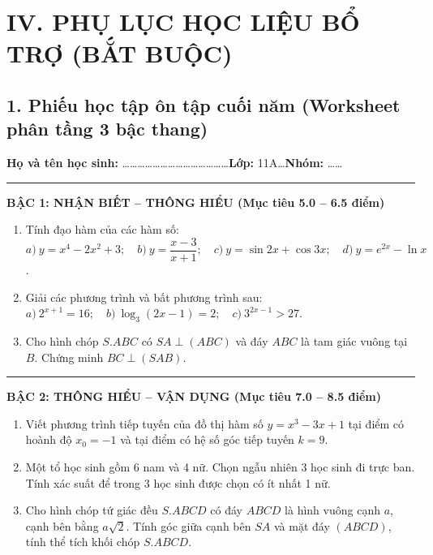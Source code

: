 \documentclass[12pt, a4paper]{article}
\begin{document}
\vspace{10pt}

\section*{IV. PHỤ LỤC HỌC LIỆU BỔ TRỢ (BẮT BUỘC)}

\subsection*{1. Phiếu học tập ôn tập cuối năm (Worksheet phân tầng 3 bậc thang)}

\begin{tcolorbox}[enhanced, colback=white, colframe=blue!70!black, arc=1.5mm, title=\textbf{PHIẾU HỌC TẬP TỔNG HỢP: ÔN TẬP CUỐI NĂM TOÁN 11}]
\textbf{Họ và tên học sinh:} \dots\dots\dots\dots\dots\dots\dots\dots\dots\dots\dots\dots\dots\dots \textbf{Lớp:} 11A\dots \quad \textbf{Nhóm:} \dots\dots

\vspace{3pt}
\hrule
\vspace{5pt}

\textbf{\large BẬC 1: NHẬN BIẾT -- THÔNG HIỂU (Mục tiêu 5.0 -- 6.5 điểm)}
\begin{enumerate}[label=\textbf{Bài 1.\arabic*.}]
    \item Tính đạo hàm của các hàm số:
    $a) \ y = x^4 - 2x^2 + 3; \quad b) \ y = \dfrac{x - 3}{x + 1}; \quad c) \ y = \sin 2x + \cos 3x; \quad d) \ y = e^{2x} - \ln x$.
    \item Giải các phương trình và bất phương trình sau:
    $a) \ 2^{x+1} = 16; \quad b) \ \log_3(2x - 1) = 2; \quad c) \ 3^{2x - 1} > 27$.
    \item Cho hình chóp $S.ABC$ có $SA \perp (ABC)$ và đáy $ABC$ là tam giác vuông tại $B$. Chứng minh $BC \perp (SAB)$.
\end{enumerate}

\vspace{5pt}
\hrule
\vspace{5pt}

\textbf{\large BẬC 2: THÔNG HIỂU -- VẬN DỤNG (Mục tiêu 7.0 -- 8.5 điểm)}
\begin{enumerate}[label=\textbf{Bài 2.\arabic*.}]
    \item Viết phương trình tiếp tuyến của đồ thị hàm số $y = x^3 - 3x + 1$ tại điểm có hoành độ $x_0 = -1$ và tại điểm có hệ số góc tiếp tuyến $k = 9$.
    \item Một tổ học sinh gồm 6 nam và 4 nữ. Chọn ngẫu nhiên 3 học sinh đi trực ban. Tính xác suất để trong 3 học sinh được chọn có ít nhất 1 nữ.
    \item Cho hình chóp tứ giác đều $S.ABCD$ có đáy $ABCD$ là hình vuông cạnh $a$, cạnh bên bằng $a\sqrt{2}$. Tính góc giữa cạnh bên $SA$ và mặt đáy $(ABCD)$, tính thể tích khối chóp $S.ABCD$.
\end{enumerate}


\end{tcolorbox}
\end{document}
